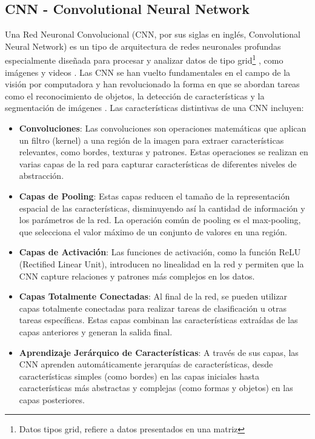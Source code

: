 \documentclass[12pt,twoside,titlepage]{ingenius}
\begin{document}
\begin{multicols}{2}
\subsection{CNN - Convolutional Neural Network} 
Una Red Neuronal Convolucional (CNN, por sus siglas en inglés, Convolutional Neural Network) es un tipo de arquitectura de redes neuronales profundas especialmente diseñada para procesar y analizar datos de tipo grid\footnote{Datos tipos grid, refiere a datos presentados en una matriz} , como imágenes y videos \cite{8}.  Las CNN se han vuelto fundamentales en el campo de la visión por computadora y han revolucionado la forma en que se abordan tareas como el reconocimiento de objetos, la detección de características y la segmentación de imágenes \cite{9}.
Las características distintivas de una CNN incluyen:
\begin{itemize}
	\item \textbf{Convoluciones}: Las convoluciones son operaciones matemáticas que aplican un filtro (kernel) a una región de la imagen para extraer características relevantes, como bordes, texturas y patrones. Estas operaciones se realizan en varias capas de la red para capturar características de diferentes niveles de abstracción.
	\item \textbf{Capas de Pooling}: Estas capas reducen el tamaño de la representación espacial de las características, disminuyendo así la cantidad de información y los parámetros de la red. La operación común de pooling es el max-pooling, que selecciona el valor máximo de un conjunto de valores en una región.
	\item \textbf{Capas de Activación}: Las funciones de activación, como la función ReLU (Rectified Linear Unit), introducen no linealidad en la red y permiten que la CNN capture relaciones y patrones más complejos en los datos.
	\item \textbf{Capas Totalmente Conectadas}: Al final de la red, se pueden utilizar capas totalmente conectadas para realizar tareas de clasificación u otras tareas específicas. Estas capas combinan las características extraídas de las capas anteriores y generan la salida final.
	\item \textbf{Aprendizaje Jerárquico de Características}: A través de sus capas, las CNN aprenden automáticamente jerarquías de características, desde características simples (como bordes) en las capas iniciales hasta características más abstractas y complejas (como formas y objetos) en las capas posteriores.
\end{itemize}


\end{multicols}
\end{document}
